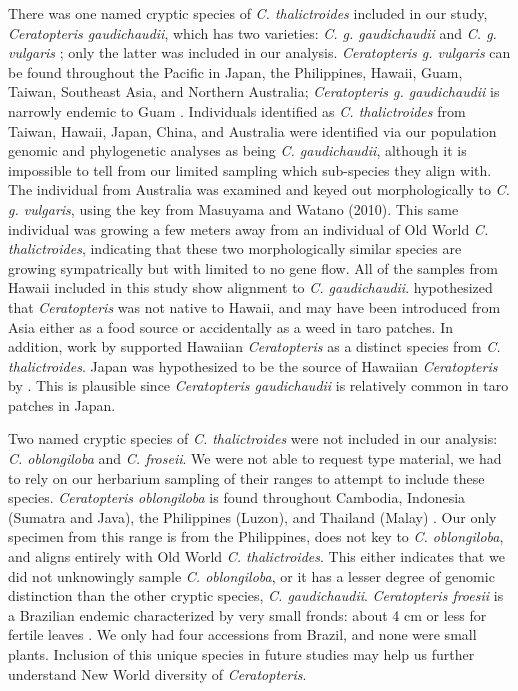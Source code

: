 \documentclass[12pt]{article}
\begin{document}
\begin{flushleft}
There was one named cryptic species of \textit{C. thalictroides} included in our study, \textit{Ceratopteris gaudichaudii}, which has two varieties: \textit{C. g. gaudichaudii} and \textit{C. g. vulgaris} \autocite{Masuyama2010}; only the latter was included in our analysis. \textit{Ceratopteris g. vulgaris} can be found throughout the Pacific in Japan, the Philippines, Hawaii, Guam, Taiwan, Southeast Asia, and Northern Australia; \textit{Ceratopteris g. gaudichaudii} is narrowly endemic to Guam \autocite{Masuyama2010}. Individuals identified as \textit{C. thalictroides} from Taiwan, Hawaii, Japan, China, and Australia were identified via our population genomic and phylogenetic analyses as being \textit{C. gaudichaudii}, although it is impossible to tell from our limited sampling which sub-species they align with. The individual from Australia was examined and keyed out morphologically to \textit{C. g. vulgaris}, using the key from Masuyama and Watano (2010). This same individual was growing a few meters away from an individual of Old World \textit{C. thalictroides}, indicating that these two morphologically similar species are growing sympatrically but with limited to no gene flow. 
All of the samples from Hawaii included in this study show alignment to \textit{C. gaudichaudii}. \textcite{Wagner1950} hypothesized that \textit{Ceratopteris} was not native to Hawaii, and may have been introduced from Asia either as a food source or accidentally as a weed in taro patches. In addition, work by \textcite{Hickok1979} supported Hawaiian \textit{Ceratopteris} as a distinct species from \textit{C. thalictroides}. Japan was hypothesized to be the source of Hawaiian \textit{Ceratopteris} by \textcite{Lloyd1973}. This is plausible since \textit{Ceratopteris gaudichaudii} is relatively common in taro patches in Japan. %

Two named cryptic species of \textit{C. thalictroides} were not included in our analysis: \textit{C. oblongiloba} and \textit{C. froseii}. We were not able to request type material, we had to rely on our herbarium sampling of their ranges to attempt to include these species. \textit{Ceratopteris oblongiloba} is found throughout Cambodia, Indonesia (Sumatra and Java), the Philippines (Luzon), and Thailand (Malay) \autocite{Masuyama2010}. Our only specimen from this range is from the Philippines, does not key to \textit{C. oblongiloba}, and aligns entirely with Old World \textit{C. thalictroides}. This either indicates that we did not unknowingly sample \textit{C. oblongiloba}, or it has a lesser degree of genomic distinction than the other cryptic species, \textit{C. gaudichaudii}. \textit{Ceratopteris froesii} is a Brazilian endemic characterized by very small fronds: about 4 cm or less for fertile leaves \autocite{Masuyama2010}. We only had four accessions from Brazil, and none were small plants. Inclusion of this unique species in future studies may help us further understand New World diversity of \textit{Ceratopteris}.


\end{flushleft}
\end{document}
